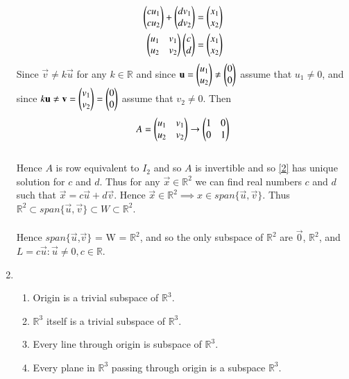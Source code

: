 \documentclass[journal,12pt,twocolumn]{IEEEtran}
\begin{document}
\begin{enumerate}[label=\alph*.]
\begin{align}
	\label{1}\begin{pmatrix}cu_1\\cu_2\end{pmatrix} + \begin{pmatrix}dv_1\\dv_2\end{pmatrix} = \begin{pmatrix}x_1\\x_2\end{pmatrix}\\
	\label{2}\begin{pmatrix}u_1 & v_1\\u_2 & v_2\end{pmatrix}\begin{pmatrix}c\\d\end{pmatrix} = \begin{pmatrix}x_1\\x_2\end{pmatrix}
\end{align}
Since $\vec{v} \neq k\vec{u}$ for any $k \in \mathbb{R}$ and since $\mathbf{u} = \begin{pmatrix}u_1 \\ u_2\end{pmatrix} \neq \begin{pmatrix}0\\0\end{pmatrix}$ assume that $u_1 \neq 0$, and since $k\mathbf{u} \neq \mathbf{v} = \begin{pmatrix}v_1\\v_2\end{pmatrix} = \begin{pmatrix}0\\0\end{pmatrix}$ assume that $v_2 \neq 0$. Then
\begin{align}\label{3}
	A = \begin{pmatrix}u_1 & v_1\\u_2 & v_2\end{pmatrix} \rightarrow \begin{pmatrix}1 & 0\\0 & 1\end{pmatrix}
\end{align}
\\
Hence $A$ is row equivalent to $I_2$ and so $A$ is invertible and so \eqref{2} has unique solution for $c$ and $d$. Thus for any $\vec{x} \in \mathbb{R}^2$ we can find real numbers $c$ and $d$ such that $\vec{x} = c\vec{u} + d\vec{v}$. Hence $\vec{x} \in \mathbb{R}^2 \implies x \in span\{\vec{u},\vec{v}\}$. Thus $\mathbb{R}^2 \subset span\{\vec{u},\vec{v}\} \subset W \subset \mathbb{R}^2$.\\
\\
Hence $span\{ \vec{u}$,$\vec{v} \}$ = W = $\mathbb{R}^2$, and so the only subspace of $\mathbb{R}^2$ are ${\vec{0}}$, $\mathbb{R}^2$, and $L = {c\vec{u} : \vec{u} \neq 0, c \in \mathbb{R}}$.
\\
\item
\begin{enumerate}[label=\arabic*.]
\item
Origin is a trivial subspace of $\mathbb{R}^3$.\\
\item
$\mathbb{R}^3$ itself is a trivial subspace of $\mathbb{R}^3$.\\
\item
Every line through origin is subspace of $\mathbb{R}^3$.\\
\item
Every plane in $\mathbb{R}^3$ passing through origin is a subspace $\mathbb{R}^3$.\\

\end{enumerate}
\end{enumerate}
\end{document}
